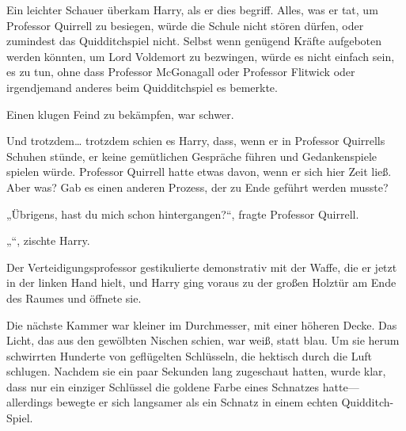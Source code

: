 Ein leichter Schauer überkam Harry, als er dies begriff. Alles, was er tat, um Professor Quirrell zu besiegen, würde die Schule nicht stören dürfen, oder zumindest das Quidditchspiel nicht. Selbst wenn genügend Kräfte aufgeboten werden könnten, um Lord Voldemort zu bezwingen, würde es nicht einfach sein, es zu tun, ohne dass Professor McGonagall oder Professor Flitwick oder irgendjemand anderes beim Quidditchspiel es bemerkte.

Einen klugen Feind zu bekämpfen, war schwer.

Und trotzdem… trotzdem schien es Harry, dass, wenn er in Professor Quirrells Schuhen stünde, er keine gemütlichen Gespräche führen und Gedankenspiele spielen würde. Professor Quirrell hatte etwas davon, wenn er sich hier Zeit ließ. Aber was? Gab es einen anderen Prozess, der zu Ende geführt werden musste?

„Übrigens, hast du mich schon hintergangen?“, fragte Professor Quirrell.

„“, zischte Harry.

Der Verteidigungsprofessor gestikulierte demonstrativ mit der Waffe, die er jetzt in der linken Hand hielt, und Harry ging voraus zu der großen Holztür am Ende des Raumes und öffnete sie.

\later

Die nächste Kammer war kleiner im Durchmesser, mit einer höheren Decke. Das Licht, das aus den gewölbten Nischen schien, war weiß, statt blau.
Um sie herum schwirrten Hunderte von geflügelten Schlüsseln, die hektisch durch die Luft schlugen. Nachdem sie ein paar Sekunden lang zugeschaut hatten, wurde klar, dass nur ein einziger Schlüssel die goldene Farbe eines Schnatzes hatte—allerdings bewegte er sich langsamer als ein Schnatz in einem echten Quidditch-Spiel.

